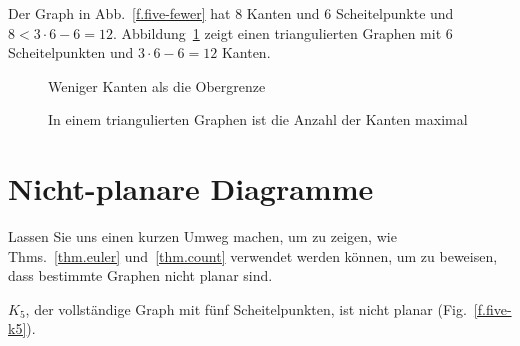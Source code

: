\begin{example}
Der Graph in Abb.~\ref{f.five-fewer} hat $8$ Kanten und $6$ Scheitelpunkte und $8< 3\cdot 6 - 6= 12$.
Abbildung~\ref{f.five-upper-limit} zeigt einen triangulierten Graphen mit $6$ Scheitelpunkten und $3\cdot 6 - 6= 12$ Kanten.
\end{example}

\begin{figure}[t]
\begin{center}
\begin{minipage}{.4\textwidth}
\caption{Weniger Kanten als die Obergrenze}\label{f.five-fewer}
\end{minipage}
\hfill
\begin{minipage}{.55\textwidth}
\caption{In einem triangulierten Graphen ist die Anzahl der Kanten maximal}\label{f.five-upper-limit}
\end{minipage}
\end{center}
\end{figure}

\section{Nicht-planare Diagramme}\label{s.nonplanar}

Lassen Sie uns einen kurzen Umweg machen, um zu zeigen, wie Thms.~\ref{thm.euler} und~\ref{thm.count} verwendet werden können, um zu beweisen, dass bestimmte Graphen nicht planar sind.

\begin{theorem}
$K_5$, der vollständige Graph mit fünf Scheitelpunkten, ist nicht planar (Fig.~\ref{f.five-k5}).
\end{theorem}

